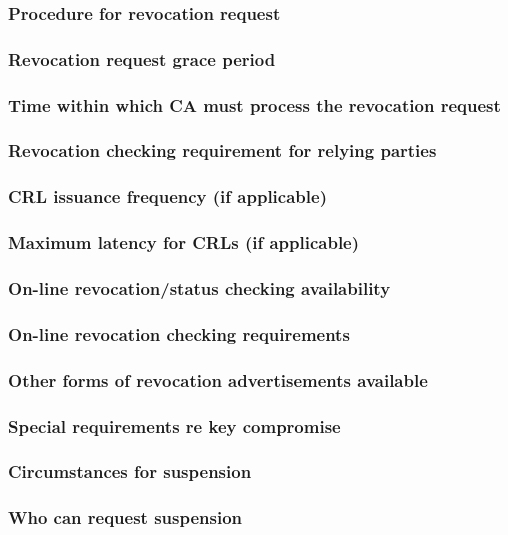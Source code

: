 \documentclass[10pt]{article}
\begin{document}
\subsubsection{Procedure for revocation request}
\subsubsection{Revocation request grace period}
\subsubsection{Time within which CA must process the revocation request}
\subsubsection{Revocation checking requirement for relying parties}
\subsubsection{CRL issuance frequency (if applicable)}
\subsubsection{Maximum latency for CRLs (if applicable)}
\subsubsection{On-line revocation/status checking availability}
\subsubsection{On-line revocation checking requirements}
\subsubsection{Other forms of revocation advertisements available}
\subsubsection{Special requirements re key compromise}
\subsubsection{Circumstances for suspension}
\subsubsection{Who can request suspension}
\end{document}
